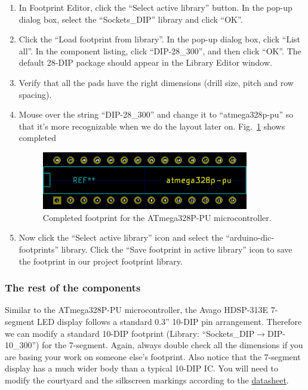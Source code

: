 \documentclass[12pt,letterpaper]{scrartcl}
\begin{document}
\begin{enumerate}
	\item In Footprint Editor, click the ``Select active library'' button. In the pop-up dialog box, select the ``Sockets\_DIP'' library and click ``OK''. 
	
	\item Click the ``Load footprint from library''. In the pop-up dialog box, click ``List all''. In the component listing, click ``DIP-28\_300'', and then click ``OK''. The default 28-DIP package should appear in the Library Editor window.
	
	\item Verify that all the pads have the right dimensions (drill size, pitch and row spacing). 
	
	\item Mouse over the string ``DIP-28\_300'' and change it to ``atmega328p-pu'' so that it's more recognizable when we do the layout later on. Fig.~\ref{fig:atmega328p-footprint-final} shows completed 	
		\begin{figure}[hp]
			\centering
			\includegraphics[width=3.55in]{atmega328p-footprint-final}
			\caption{Completed footprint for the ATmega328P-PU microcontroller.}
			\label{fig:atmega328p-footprint-final}
		\end{figure}
		
	\item Now click the ``Select active library'' icon and select the ``arduino-dic-footprints'' library. Click the ``Save footprint in active library'' icon to save the footprint in our project footprint library. 
\end{enumerate}

\subsubsection{The rest of the components}
Similar to the ATmega328P-PU microcontroller, the Avago HDSP-313E 7-segment LED display follows a standard 0.3'' 10-DIP pin arrangement. Therefore we can modify a standard 10-DIP footprint (Library: ``Sockets\_DIP$\rightarrow $DIP-10\_300'') for the 7-segment. Again, always double check all the dimensions if you are basing your work on someone else's footprint. Also notice that the 7-segment display has a much wider body than a typical 10-DIP IC. You will need to modify the courtyard and the silkscreen markings according to the \href{http://www.avagotech.com/docs/AV02-3585EN}{datasheet}. 
\end{document}
